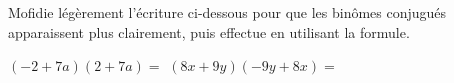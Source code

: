 %
%
Mofidie légèrement l'écriture ci-dessous pour que les binômes conjugués apparaissent plus clairement, puis effectue en utilisant la formule.
  \begin{tasks}
    \task $\left(-2+7a\right)\left(2+7a\right)=$
    \task $\left(8x+9y\right)\left(-9y+8x\right)=$
  \end{tasks}
